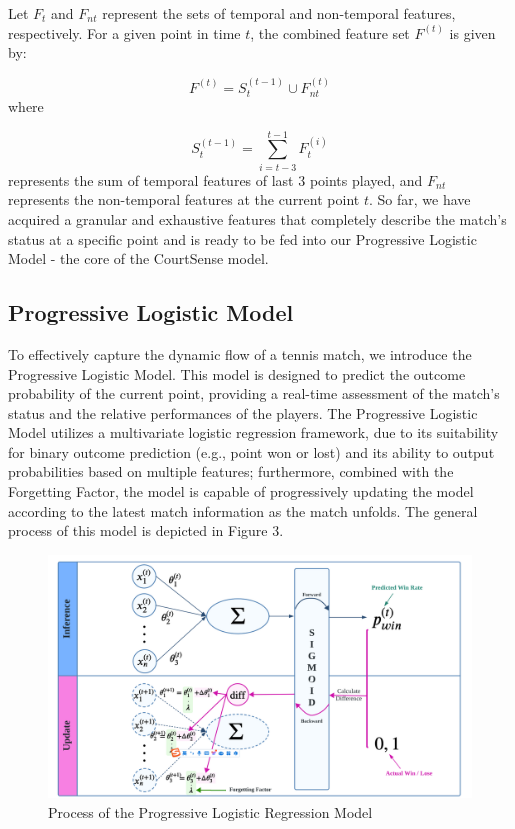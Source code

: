 \documentclass[12pt]{article}  %
\begin{document}
Let \( F_{t} \) and \( F_{nt} \) represent the sets of temporal and non-temporal features, respectively. For a given point in time \( t \), the combined feature set \( F^{(t)} \) is given by:

\[
F^{(t)} = S_{t}^{(t-1)} \cup F_{nt}^{(t)}
\]
where

\[
S_{t}^{(t-1)} = \sum_{i=t-3}^{t-1} F_{t}^{(i)}
\]
represents the sum of temporal features of last 3 points played, and \( F_{nt} \) represents the non-temporal features at the current point \( t \). So far, we have acquired a granular and exhaustive features that completely describe the match's status at a specific point and is ready to be fed into our Progressive Logistic Model - the core of the CourtSense model.

\subsection{Progressive Logistic Model}
To effectively capture the dynamic flow of a tennis match, we introduce the Progressive Logistic Model. This model is designed to predict the outcome probability of the current point, providing a real-time assessment of the match's status and the relative performances of the players. The Progressive Logistic Model utilizes a multivariate logistic regression framework, due to its suitability for binary outcome prediction (e.g., point won or lost) and its ability to output probabilities based on multiple features; furthermore, combined with the Forgetting Factor, the model is capable of progressively updating the model according to the latest match information as the match unfolds. The general process of this model is depicted in Figure 3. 

\begin{figure}[htbp]  %
	\centering  %
	\includegraphics[width=.9\textwidth]{logistic.png} %
	\caption{Process of the Progressive Logistic Regression Model} %
\end{figure}
\vspace{-0.8cm}
\end{document}
